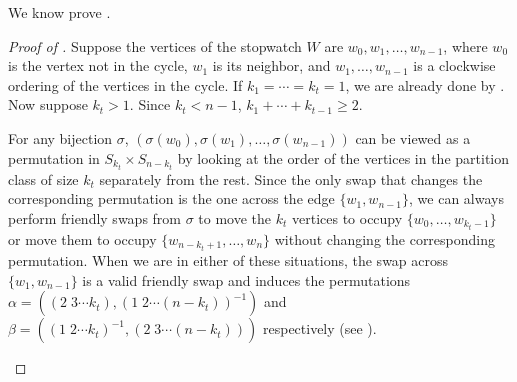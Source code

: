 \documentclass{mystyle}
\begin{document}
We know prove .
\begin{proof}[Proof of ]
    Suppose the vertices of the stopwatch $W$ are $w_0, w_1, \ldots, w_{n-1}$, where $w_0$ is the vertex not in the cycle, $w_1$ is its neighbor, and $w_1, \ldots, w_{n-1}$ is a clockwise ordering of the vertices in the cycle. If $k_1 = \cdots = k_t = 1$, we are already done by . Now suppose $k_t > 1$. Since $k_t < n - 1$, $k_1 + \cdots + k_{t - 1} \geq 2$. 
    
    For any bijection $\sigma$, $(\sigma(w_0), \sigma(w_1), \ldots, \sigma(w_{n - 1}))$ can be viewed as a permutation in $S_{k_t} \times S_{n - k_t}$ by looking at the order of the vertices in the partition class of size $k_t$ separately from the rest. Since the only swap that changes the corresponding permutation is the one across the edge $\{w_1, w_{n - 1}\}$, we can always perform friendly swaps from $\sigma$ to move the $k_t$ vertices to occupy $\{w_0, \ldots, w_{k_t - 1}\}$ or move them to occupy $\{w_{n - k_t + 1}, \ldots, w_{n}\}$ without changing the corresponding permutation. When we are in either of these situations, the swap across $\{w_1, w_{n - 1}\}$ is a valid friendly swap and induces the permutations $\alpha = ((2 \; 3 \cdots k_t), (1 \; 2 \cdots (n-k_t))^{-1})$ and $\beta = ((1 \; 2 \cdots k_t)^{-1}, (2 \; 3 \cdots (n-k_t)))$ respectively (see ). 

    \begin{figure}[ht]
    \centering
\end{figure}
\end{proof}
\end{document}
